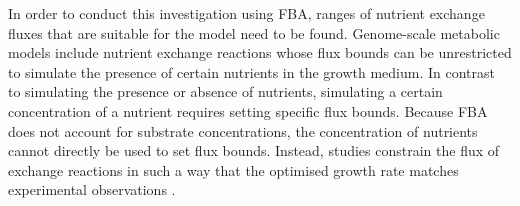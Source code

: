 In order to conduct this investigation using FBA, ranges of nutrient exchange fluxes that are suitable for the model need to be found.
Genome-scale metabolic models include nutrient exchange reactions whose flux bounds can be unrestricted to simulate the presence of certain nutrients in the growth medium.
In contrast to simulating the presence or absence of nutrients, simulating a certain concentration of a nutrient requires setting specific flux bounds.
Because FBA does not account for substrate concentrations, the concentration of nutrients cannot directly be used to set flux bounds.
Instead, studies constrain the flux of exchange reactions in such a way that the optimised growth rate matches experimental observations \parencite{elsemmanWholecellModelingYeast2022}.


